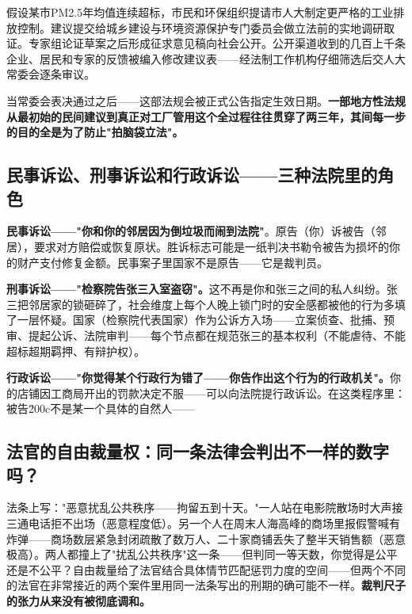 \documentclass[a4paper,12pt]{ctexart}
\begin{document}
假设某市PM2.5年均值连续超标，市民和环保组织提请市人大制定更严格的工业排放控制。建议提交给城乡建设与环境资源保护专门委员会做立法前的实地调研取证。专家组论证草案之后形成征求意见稿向社会公开。公开渠道收到的几百上千条企业、居民和专家的反馈被编入修改建议表——经法制工作机构仔细筛选后交人大常委会逐条审议。

当常委会表决通过之后——这部法规会被正式公告指定生效日期。\textbf{一部地方性法规从最初始的民间建议到真正对工厂管用这个全过程往往贯穿了两三年，其间每一步的目的全是为了防止"拍脑袋立法"。}

\subsection*{民事诉讼、刑事诉讼和行政诉讼——三种法院里的角色}

\textbf{民事诉讼——"你和你的邻居因为倒垃圾而闹到法院"}。原告（你）诉被告（邻居），要求对方赔偿或恢复原状。胜诉标志可能是一纸判决书勒令被告为损坏的你的财产支付修复金额。民事案子里国家不是原告——它是裁判员。

\textbf{刑事诉讼——"检察院告张三入室盗窃"。}这不再是你和张三之间的私人纠纷。张三把邻居家的锁砸碎了，社会维度上每个人晚上锁门时的安全感都被他的行为多填了一层怀疑。国家（检察院代表国家）作为公诉方入场——立案侦查、批捕、预审、提起公诉、法院审判——每个节点都在规范张三的基本权利（不能虐待、不能超标超期羁押、有辩护权）。

\textbf{行政诉讼——"你觉得某个行政行为错了——你告作出这个行为的行政机关"。}你的店铺因工商局开出的罚款决定不服——可以向法院提行政诉讼。在这类程序里：被告\u200c不是某一个具体的自然人——

\subsection*{法官的自由裁量权：同一条法律会判出不一样的数字吗？}

法条上写："恶意扰乱公共秩序——拘留五到十天。"一人站在电影院散场时大声接三通电话拒不出场（恶意程度低）。另一个人在周末人海高峰的商场里报假警喊有炸弹——商场数层紧急封闭疏散了数万人、二十家商铺丢失了整半天销售额（恶意极高）。两人都撞上了"扰乱公共秩序"这一条——但判同一等天数，你觉得是公平还是不公平？自由裁量给了法官结合具体情节匹配惩罚力度的空间——但两个不同的法官在非常接近的两个案件里用同一法条写出的刑期的确可能不一样。\textbf{裁判尺子的张力从来没有被彻底调和。}
\end{document}
